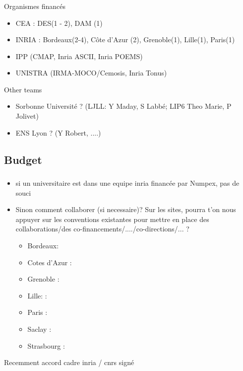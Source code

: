 \begin{frame}
  \frametitle{\insertsectionhead}
  \framesubtitle{\insertsubsectionhead}

  Organismes financés
  \begin{itemize}
    \item CEA : DES(1 - 2), DAM (1)
    \item INRIA : Bordeaux(2-4),  Côte d'Azur (2), Grenoble(1), Lille(1), Paris(1)
    \item IPP (CMAP, Inria ASCII, Inria POEMS)
    \item UNISTRA  (IRMA-MOCO/Cemosis, Inria Tonus)
  \end{itemize}

  \begin{alertblock}{Other teams}
    \begin{itemize}
      \item Sorbonne Université ? (LJLL: Y  Maday, S Labbé; LIP6 Theo Marie, P Jolivet)
      \item ENS Lyon ? (Y Robert, ....) 
    \end{itemize}
  \end{alertblock}
\end{frame}

\subsection{Budget}

\begin{frame}
  \frametitle{\insertsectionhead}
  \framesubtitle{\insertsubsectionhead}
  \begin{itemize}
    \item si un universitaire est dans une equipe inria financée par Numpex, pas de souci
    \item Sinon comment collaborer (si necessaire)? Sur les sites, pourra t'on nous appuyer sur les conventions existantes pour 
    mettre en place des collaborations/des co-financements/..../co-directions/... ?
    \begin{itemize}
      \item Bordeaux:
      \item Cotes d'Azur : 
      \item Grenoble : 
      \item Lille:  : 
      \item Paris : 
      \item Saclay : 
      \item Strasbourg : 
    \end{itemize}
  \end{itemize}
  \alert{Recemment accord cadre inria / cnrs signé}

\end{frame}

